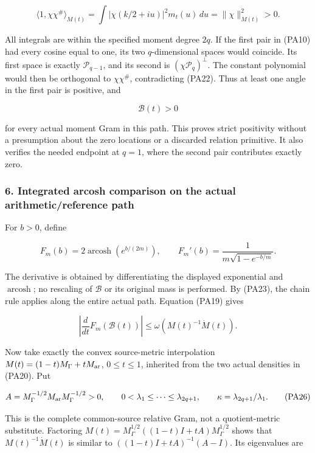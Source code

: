 \documentclass{article}
\begin{document}
\[
\langle1,\chi\chi^\#\rangle_{M(t)}
=\int|\chi(k/2+iu)|^2m_t(u)\,du
=\|\chi\|_{M(t)}^2>0.
\tag{PA22}
\]

All integrals are within the specified moment degree \(2q\). If the first pair in (PA10) had every cosine equal to one, its two \(q\)-dimensional spaces would coincide. Its first space is exactly \(\mathcal P_{q-1}\), and its second is \((\chi\mathcal P_q)^\perp\). The constant polynomial would then be orthogonal to \(\chi\chi^\#\), contradicting (PA22). Thus at least one angle in the first pair is positive, and

\[
\boxed{\mathcal B(t)>0}
\tag{PA23}
\]

for every actual moment Gram in this path. This proves strict positivity without a presumption about the zero locations or a discarded relation primitive. It also verifies the needed endpoint at \(q=1\), where the second pair contributes exactly zero.

\subsubsection{6. Integrated arcosh comparison on the actual arithmetic/reference path}\label{endpoint-principal_angle_volume_review--integrated-arcosh-comparison-on-the-actual-arithmeticreference-path}

For \(b>0\), define

\[
F_m(b)=2\operatorname{arcosh}(e^{b/(2m)}),
\qquad
F_m'(b)=\frac{1}{m\sqrt{1-e^{-b/m}}}.
\tag{PA24}
\]

The derivative is obtained by differentiating the displayed exponential and \(\operatorname{arcosh}\); no rescaling of \(\mathcal B\) or its original mass is performed. By (PA23), the chain rule applies along the entire actual path. Equation (PA19) gives

\[
\left|\frac{d}{dt}F_m(\mathcal B(t))\right|
\le\omega(M(t)^{-1}\dot M(t)).
\tag{PA25}
\]

Now take exactly the convex source-metric interpolation \(M(t)=(1-t)M_\Gamma+tM_{\rm ar}\), \(0\le t\le1\), inherited from the two actual densities in (PA20). Put

\[
A=M_\Gamma^{-1/2}M_{\rm ar}M_\Gamma^{-1/2}>0,
\qquad 0<\lambda_1\le\cdots\le\lambda_{2q+1},
\qquad \kappa=\lambda_{2q+1}/\lambda_1.
\tag{PA26}
\]

This is the complete common-source relative Gram, not a quotient-metric substitute. Factoring \(M(t)=M_\Gamma^{1/2}((1-t)I+tA)M_\Gamma^{1/2}\) shows that \(M(t)^{-1}\dot M(t)\) is similar to \(((1-t)I+tA)^{-1}(A-I)\). Its eigenvalues are
\end{document}
